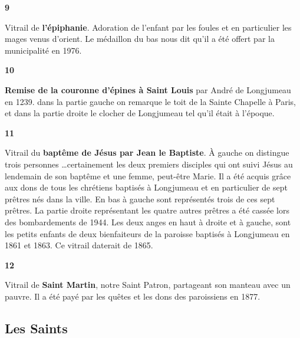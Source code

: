 \documentclass[a5paper, 9pt]{extarticle}
\newcommand{\linednote}[2]{
  \noindent
  \parbox[t]{0.9cm}{\small \textbf{#1}}%
  \parbox[t]{\dimexpr\linewidth-0.9cm}{\normalsize #2 \vspace{0.4em}}
  \newline
}
\begin{document}
\linednote{9}{Vitrail de \textbf{l'épiphanie}. Adoration de l'enfant par les
foules et en particulier les mages venus d'orient. Le médaillon du bas
nous dit qu'il a été offert par la municipalité en 1976.}
\linednote{10}{\textbf{Remise de la couronne d'épines à Saint Louis} par André
de Longjumeau en 1239. dans la partie gauche on remarque le toit de la
Sainte Chapelle à Paris, et dans la partie droite le clocher de
Longjumeau tel qu'il était à l'époque.}
\linednote{11}{Vitrail du \textbf{baptême de Jésus par Jean le Baptiste}.
À gauche on distingue trois personnes \dots certainement les deux
premiers disciples qui ont suivi Jésus au lendemain de son baptême et
une femme, peut-être Marie. Il a été acquis grâce aux dons de tous les
chrétiens baptisés à Longjumeau et en particulier de sept prêtres nés
dans la ville. En bas à gauche sont représentés trois de ces sept
prêtres. La partie droite représentant les quatre autres prêtres a été
cassée lors des bombardements de 1944. Les deux anges en haut à droite
et à gauche, sont les petits enfants de deux bienfaiteurs de la
paroisse baptisés à Longjumeau en 1861 et 1863. Ce vitrail daterait de
1865.}
\linednote{12}{Vitrail de \textbf{Saint Martin}, notre Saint Patron,
  partageant son manteau avec un pauvre. Il a été payé par les quêtes
  et les dons des paroissiens en 1877.}

\subsection*{Les Saints}
\end{document}
